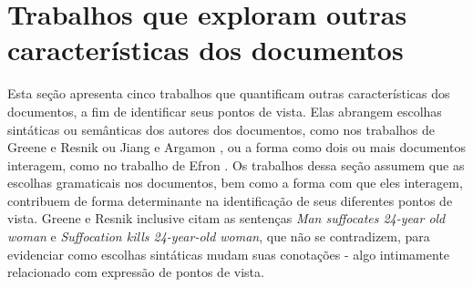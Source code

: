 





\section{Trabalhos que exploram outras características dos documentos}
\label{sintaxe}

Esta seção apresenta cinco trabalhos que quantificam outras características dos documentos, a fim de identificar seus pontos de vista. Elas abrangem escolhas sintáticas ou semânticas dos autores dos documentos, como nos trabalhos de Greene e Resnik \cite{resnik} ou Jiang e Argamon \cite{jiang-argamon}, ou a forma como dois ou mais documentos interagem, como no trabalho de Efron \cite{efron}. Os trabalhos dessa seção assumem que as escolhas gramaticais nos documentos, bem como a forma com que eles interagem, contribuem de forma determinante na identificação de seus diferentes pontos de vista. Greene e Resnik inclusive citam as sentenças \emph{Man suffocates 24-year old woman} e \emph{Suffocation kills 24-year-old woman}, que não se contradizem, para evidenciar como escolhas sintáticas mudam suas conotações \cite{greene} - algo intimamente relacionado com expressão de pontos de vista.

